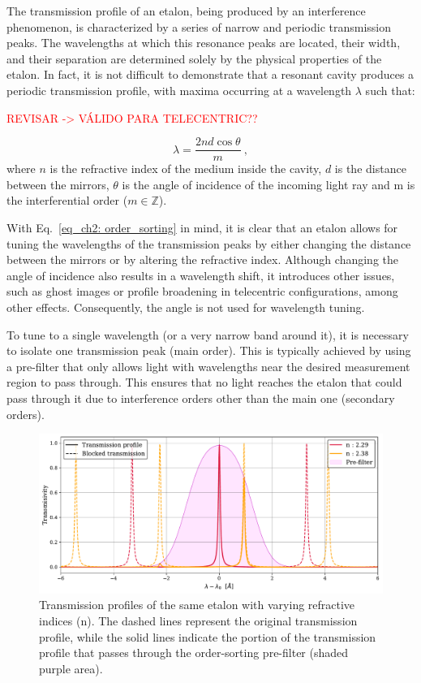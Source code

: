 The transmission profile of an etalon, being produced by an interference phenomenon, is characterized by a series of narrow and periodic transmission peaks. The wavelengths at which this resonance peaks are located, their width, and their separation are determined solely by the physical properties of the etalon. In fact, it is not difficult to demonstrate \citep{franI} that a resonant cavity produces a periodic transmission profile, with maxima occurring at a wavelength $\lambda$ such that:

\textcolor{red}{REVISAR -> VÁLIDO PARA TELECENTRIC??} 

\begin{equation}
\lambda = \frac{2nd\cos \theta}{m}\ ,
\label{eq_ch2: order_sorting}
\end{equation}
where $n$ is the refractive index of the medium inside the cavity, $d$ is the distance between the mirrors, $\theta$ is the angle of incidence of the incoming light ray and m is the interferential order ($m \in \mathbb{Z} $). 

With Eq.~\eqref{eq_ch2: order_sorting} in mind, it is clear that an etalon allows for tuning the wavelengths of the transmission peaks by either changing the distance between the mirrors or by altering the refractive index. Although changing the angle of incidence also results in a wavelength shift, it introduces other issues, such as ghost images or profile broadening in telecentric configurations, among other effects. Consequently, the angle is not used for wavelength tuning.

To tune to a single wavelength (or a very narrow band around it), it is necessary to isolate one transmission peak (main order). This is typically achieved by using a pre-filter that only allows light with wavelengths near the desired measurement region to pass through. This ensures that no light reaches the etalon that could pass through it due to interference orders other than the main one (secondary orders). 

\begin{figure}
  \centering
  \includegraphics[width = \textwidth]{figures/Introduction_to_spectropolarimeters/Etalon_and_prefilter_example.pdf}
  \caption{Transmission profiles of the same etalon with varying refractive indices (n). The dashed lines represent the original transmission profile, while the solid lines indicate the portion of the transmission profile that passes through the order-sorting pre-filter (shaded purple area).} 
  \label{fig_ch2: etalon_example}
\end{figure}

